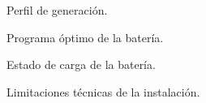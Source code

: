 \begin{figure}
  \centering
  \caption{Perfil de generación.}
  \label{fig:perfil-generación}
\end{figure}

\begin{figure}
  \centering
  \caption{Programa óptimo de la batería.}
  \label{fig:programa-óptimo}
\end{figure}

\begin{figure}
  \centering
  \caption{Estado de carga de la batería.}
  \label{fig:soc-bess}
\end{figure}

\begin{figure}
  \centering
  \caption{Limitaciones técnicas de la instalación.}
  \label{fig:limitaciones-técnicas}
\end{figure}
